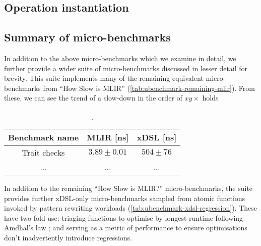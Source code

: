 

\subsection{Operation instantiation}

\subsection{Summary of micro-benchmarks}

In addition to the above micro-benchmarks which we examine in detail, we further provide a wider suite of micro-benchmarks discussed in lesser detail for brevity. %
This suite implements many of the remaining equivalent micro-benchmarks from ``How Slow is MLIR'' (\autoref{tab:ubenchmark-remaining-mlir}).
From these, we can see the trend of a slow-down in the order of $xy\times$ holds 

\begin{table}[H]
  \caption{.}
  \label{tab:ubenchmark-remaining-mlir}
  \centering
  \begin{tabular}{ccc}
    \toprule
    \textbf{Benchmark name} & \textbf{MLIR [ns]} & \textbf{xDSL [ns]}\\
    \midrule
    Trait checks & $3.89 \pm 0.01$ & $504 \pm 76$ \\
    ... & ... & ... \\
    \bottomrule
  \end{tabular}
\end{table}


In addition to the remaining ``How Slow is MLIR?'' micro-benchmarks, the suite provides further xDSL-only micro-benchmarks sampled from atomic functions invoked by pattern rewriting workloads (\autoref{tab:ubenchmark-xdsl-regression}).
These have two-fold use: triaging functions to optimise by longest runtime following Amdhal's law \cite{amdahlValiditySingleProcessor1967}; and serving as a metric of performance to ensure optimisations don't inadvertently introduce regressions.


